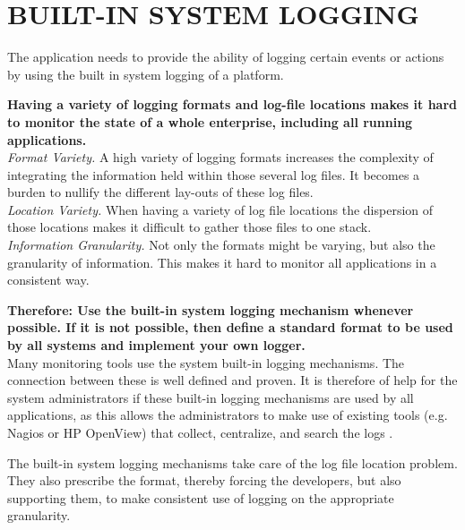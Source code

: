 \newpage
\section*{BUILT-IN SYSTEM LOGGING}

The application needs to provide the ability of logging certain events or actions by using the built in system logging of a platform. 

\begin{center}
  
\end{center}

\textbf{Having a variety of logging formats and log-file locations makes it hard to monitor the state of a whole enterprise, including all running applications.}\\

\textit{Format Variety.} A high variety of logging formats increases the complexity of integrating the information held within those several log files. It becomes a burden to nullify the different lay-outs of these log files.\\ 

\textit{Location Variety.} When having a variety of log file locations the dispersion of those locations makes it difficult to gather those files to one stack.\\

\textit{Information Granularity.} Not only the formats might be varying, but also the granularity of information. This makes it hard to monitor all applications in a consistent way.

\begin{center}
   
\end{center}

\textbf{Therefore: Use the built-in system logging mechanism whenever possible. If it is not possible, then define a standard format to be used by all systems and implement your own logger.}\\

Many monitoring tools use the system built-in logging mechanisms. The connection between these is well defined and proven. It is therefore of help for the system administrators if these built-in logging mechanisms are used by all applications, as this allows the administrators to make use of existing tools (e.g. Nagios or HP OpenView) that collect, centralize, and search the logs \cite{Limoncelli2011a}.

The built-in system logging mechanisms take care of the log file location problem. They also prescribe the format, thereby forcing the developers, but also supporting them, to make consistent use of logging on the appropriate granularity.

